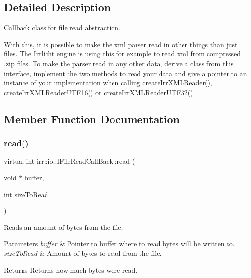 \subsection{Detailed Description}
Callback class for file read abstraction. 

With this, it is possible to make the xml parser read in other things than just files. The Irrlicht engine is using this for example to read xml from compressed .zip files. To make the parser read in any other data, derive a class from this interface, implement the two methods to read your data and give a pointer to an instance of your implementation when calling \hyperlink{namespaceirr_1_1io_a638e38fd4c6d6e40ce4f332be6a3b570}{create\+Irr\+X\+M\+L\+Reader()}, \hyperlink{namespaceirr_1_1io_a2b7451dc3f1606c80bf46be9ccc955d9}{create\+Irr\+X\+M\+L\+Reader\+U\+T\+F16()} or \hyperlink{namespaceirr_1_1io_a69d4b7a461a7a0b8715d346bbe9a49b0}{create\+Irr\+X\+M\+L\+Reader\+U\+T\+F32()} 

\subsection{Member Function Documentation}
\mbox{\label{classirr_1_1io_1_1IFileReadCallBack_ae8c57b8454078aa2acd39772a6aa4439}} 
\subsubsection{\texorpdfstring{read()}{read()}\hspace{0.1cm}{\footnotesize\ttfamily [1/2]}}
{\footnotesize\ttfamily virtual int irr\+::io\+::\+I\+File\+Read\+Call\+Back\+::read (\begin{DoxyParamCaption}\item[{void $\ast$}]{buffer,  }\item[{int}]{size\+To\+Read }\end{DoxyParamCaption})\hspace{0.3cm}{\ttfamily [pure virtual]}}



Reads an amount of bytes from the file. 


\begin{DoxyParams}{Parameters}
{\em buffer} & Pointer to buffer where to read bytes will be written to. \\
\hline
{\em size\+To\+Read} & Amount of bytes to read from the file. \\
\hline
\end{DoxyParams}
\begin{DoxyReturn}{Returns}
Returns how much bytes were read. 
\end{DoxyReturn}
\mbox{\label{classirr_1_1io_1_1IFileReadCallBack_ae8c57b8454078aa2acd39772a6aa4439}} 
